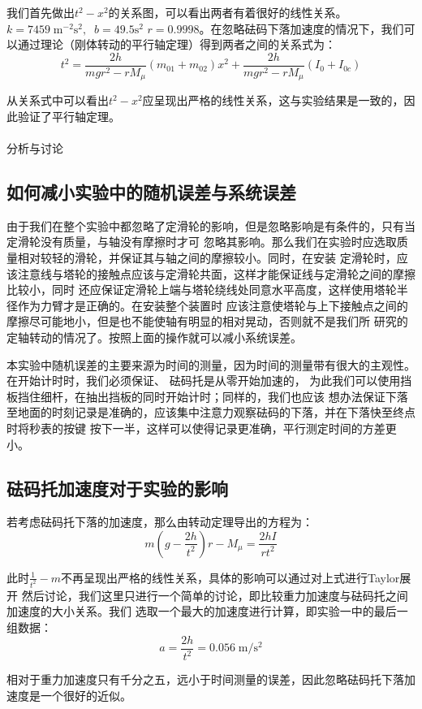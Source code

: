 \documentclass[a4paper]{ctexart}
\makeatletter
\renewcommand{\section}{\@startsection{section}{1}{0mm}
	{-\baselineskip}{0.5\baselineskip}{\bf\leftline}}
\makeatother
\begin{document}
    \par 
    我们首先做出$t^{2}-x^{2}$的关系图，可以看出两者有着很好的线性关系。$k = 7459\;\mathrm{m^{-2}s^{2}},\;\; b=49.5 \mathrm{s^{2}}$
    $r = 0.9998$。在忽略砝码下落加速度的情况下，我们可以通过理论（刚体转动的平行轴定理）得到两者之间的关系式为：
    $$
    t^{2} = \frac{2h}{mgr^{2}-rM_{\mu}}(m_{01} + m_{02})x^{2} + \frac{2h}{mgr^{2} - rM_{\mu}}(I_0 + I_{0c})
    $$
    \par 
    从关系式中可以看出$t^{2}-x^{2}$应呈现出严格的线性关系，这与实验结果是一致的，因此验证了平行轴定理。\\
    \\
    \section{\large{分析与讨论}}
    \subsection{如何减小实验中的随机误差与系统误差}
    \par 
    由于我们在整个实验中都忽略了定滑轮的影响，但是忽略影响是有条件的，只有当定滑轮没有质量，与轴没有摩擦时才可
    忽略其影响。那么我们在实验时应选取质量相对较轻的滑轮，并保证其与轴之间的摩擦较小。同时，在安装
    定滑轮时，应该注意线与塔轮的接触点应该与定滑轮共面，这样才能保证线与定滑轮之间的摩擦比较小，同时
    还应保证定滑轮上端与塔轮绕线处同意水平高度，这样使用塔轮半径作为力臂才是正确的。在安装整个装置时
    应该注意使塔轮与上下接触点之间的摩擦尽可能地小，但是也不能使轴有明显的相对晃动，否则就不是我们所
    研究的定轴转动的情况了。按照上面的操作就可以减小系统误差。
    \par 
    本实验中随机误差的主要来源为时间的测量，因为时间的测量带有很大的主观性。在开始计时时，我们必须保证、
    砝码托是从零开始加速的， 为此我们可以使用挡板挡住细杆，在抽出挡板的同时开始计时；同样的，我们也应该
    想办法保证下落至地面的时刻记录是准确的，应该集中注意力观察砝码的下落，并在下落快至终点时将秒表的按键
    按下一半，这样可以使得记录更准确，平行测定时间的方差更小。
    \subsection{砝码托加速度对于实验的影响}
    \par 
    若考虑砝码托下落的加速度，那么由转动定理导出的方程为：
    $$
    m\left(g-\frac{2h}{t^{2}}\right)r - M_{\mu} = \frac{2hI}{rt^{2}}
    $$
    \par 
    此时$\frac{1}{t^{2}}-m$不再呈现出严格的线性关系，具体的影响可以通过对上式进行Taylor展开
    然后讨论，我们这里只进行一个简单的讨论，即比较重力加速度与砝码托之间加速度的大小关系。我们
    选取一个最大的加速度进行计算，即实验一中的最后一组数据：
    $$
    a = \frac{2h}{t^{2}} = 0.056\;\mathrm{m/s^{2}}
    $$
    \par 
    相对于重力加速度只有千分之五，远小于时间测量的误差，因此忽略砝码托下落加速度是一个很好的近似。
\end{document}
